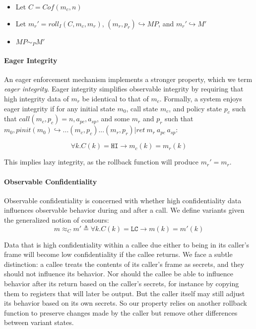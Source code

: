 \documentclass[conference]{IEEEtran}
\newcommand{\MP}{\mathit{MP}}
\begin{document}
          \begin{itemize}
            \item Let \(C = \mathit{Cof}(m_c,n)\)
            \item Let \(m_r' = \mathit{roll}_I(C,m_c,m_r)\), \((m_r,p_r) \hookrightarrow \MP\), and
              \(m_r' \hookrightarrow M'\)
            \item \(\MP \sim_P M'\)
          \end{itemize}

    \paragraph{Eager Integrity}
 
      An eager enforcement mechanism implements a stronger property, which we term {\it eager integrity}.
      Eager integrity simplifies observable integrity by requiring that high integrity data of \(m_r\) be
      identical to that of \(m_c\). Formally, a system enjoys eager integrity if for any initial state
      \(m_0\), call state \(m_c\), and policy state \(p_c\) such that \(\mathit{call}(m_c,p_c) =
      n, a_{pc}, a_{sp}\), and some \(m_r\) and \(p_r\) such that
      \(m_0,\mathit{pinit}(m_0) \hookrightarrow ... (m_c,p_c) ... (m_r,p_r) | \mathit{ret}\ m_r\ a_{pc}\ a_{sp}\):

      \[\forall k . C(k) = \mathtt{HI} \rightarrow m_c(k) = m_r(k)\]

      This implies lazy integrity, as the rollback function will produce \(m_r' = m_r\).
 
    \paragraph{Observable Confidentiality}

      Observable confidentiality is concerned with whether high confidentiality data influences
      observable behavior during and after a call. We define variants given the generalized notion
      of contours:
      \[m \approx_C m' \triangleq \forall k . C(k) = \mathtt{LC} \rightarrow m(k) = m'(k)\]

      Data that is high confidentiality within a callee due either to being in its caller's frame
      will become low confidentiality if the callee returns. We face a subtle distinction: 
      a callee treats the contents of its caller's frame as secrets, and they should not influence
      its behavior. Nor should the callee be able to influence behavior after its return based
      on the caller's secrets, for instance by copying them to registers that will later be output.
      But the caller itself may still adjust its behavior based on its own secrets. So our property
      relies on another rollback function to preserve changes made by the caller but remove other
      differences between variant states.
\end{document}
